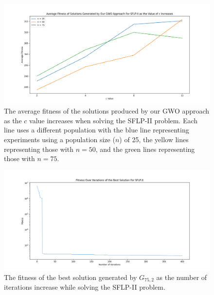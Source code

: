 \begin{figure}[h!]
\centering
\begin{adjustwidth}{-0.45in}{}
	\includegraphics[scale=0.5]{./images/chap07-rd/gwo-only-sflp2-average-fitness-as-c-value-increases.png}
\end{adjustwidth}
\caption{The average fitness of the solutions produced by our GWO approach as the $c$ value increases when solving the SFLP-II problem. Each line uses a different population with the blue line representing experiments using a population size ($n$) of 25, the yellow lines representing those with $n = 50$, and the green lines representing those with $n = 75$.}
\label{approach-gwo-sflp-ii-average-fitness-as-c-value-increases}
\end{figure}

\begin{figure}[h!]
\centering
\begin{adjustwidth}{-0.45in}{}
	\includegraphics[scale=0.5]{./images/chap07-rd/gwo-only-sflp2-best-solution-fitness-graph.png}
\end{adjustwidth}
\caption{The fitness of the best solution generated by $G_{75,2}$ as the number of iterations increase while solving the SFLP-II problem.}
\label{approach-gwo-sflp-ii-best-solution-fitness-over-time}
\end{figure}

